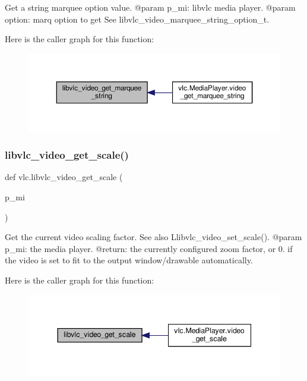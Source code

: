 \begin{DoxyVerb}Get a string marquee option value.
@param p_mi: libvlc media player.
@param option: marq option to get See libvlc_video_marquee_string_option_t.
\end{DoxyVerb}
 Here is the caller graph for this function\+:
\nopagebreak
\begin{figure}[H]
\begin{center}
\leavevmode
\includegraphics[width=350pt]{namespacevlc_ac9f15587fc7e277e517c65164b9bdf6f_icgraph}
\end{center}
\end{figure}
\mbox{\label{namespacevlc_a28d5c283978b730a725f3a892f93ba7f}} 
\subsubsection{\texorpdfstring{libvlc\+\_\+video\+\_\+get\+\_\+scale()}{libvlc\_video\_get\_scale()}}
{\footnotesize\ttfamily def vlc.\+libvlc\+\_\+video\+\_\+get\+\_\+scale (\begin{DoxyParamCaption}\item[{}]{p\+\_\+mi }\end{DoxyParamCaption})}

\begin{DoxyVerb}Get the current video scaling factor.
See also L{libvlc_video_set_scale}().
@param p_mi: the media player.
@return: the currently configured zoom factor, or 0. if the video is set to fit to the output window/drawable automatically.
\end{DoxyVerb}
 Here is the caller graph for this function\+:
\nopagebreak
\begin{figure}[H]
\begin{center}
\leavevmode
\includegraphics[width=344pt]{namespacevlc_a28d5c283978b730a725f3a892f93ba7f_icgraph}
\end{center}
\end{figure}
\mbox{\label{namespacevlc_a58dd475be13d1393cc878b2dd94df81a}} 
